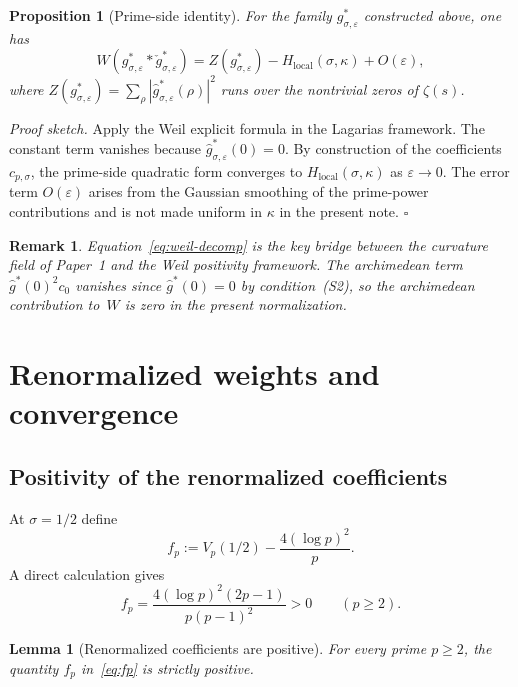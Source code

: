 \documentclass[11pt]{article}
\newtheorem*{lemma*}{Lemma}
\newtheorem*{proposition*}{Proposition}
\newtheorem*{remark*}{Remark}
\begin{document}
\begin{proposition*}[Prime-side identity]
For the family $g^*_{\sigma,\varepsilon}$ constructed above, one has
\begin{equation}\label{eq:weil-decomp}
W(g^*_{\sigma,\varepsilon} * \check g^*_{\sigma,\varepsilon})
=
Z(g^*_{\sigma,\varepsilon}) - H_{\mathrm{local}}(\sigma,\kappa) + O(\varepsilon),
\end{equation}
where
$Z(g^*_{\sigma,\varepsilon}) = \sum_{\rho}
|\widehat g^*_{\sigma,\varepsilon}(\rho)|^2$
runs over the nontrivial zeros of $\zeta(s)$.
\end{proposition*}

\textit{Proof sketch.}
Apply the Weil explicit formula in the Lagarias framework. The constant
term vanishes because $\widehat g^*_{\sigma,\varepsilon}(0)=0$.
By construction of the coefficients $c_{p,\sigma}$, the prime-side quadratic
form converges to $H_{\mathrm{local}}(\sigma,\kappa)$ as $\varepsilon\to 0$.
The error term $O(\varepsilon)$ arises from the Gaussian smoothing of the
prime-power contributions and is not made uniform in $\kappa$ in the present
note. \hfill$\square$

\begin{remark*}
Equation~\eqref{eq:weil-decomp} is the key bridge between the curvature field
of Paper~1 and the Weil positivity framework. The archimedean
term $\hat{g}^*(0)^2 c_0$ vanishes since $\hat{g}^*(0)=0$
by condition~(S2), so the archimedean contribution to~$W$
is zero in the present normalization.
\end{remark*}

\section{Renormalized weights and convergence}

\subsection{Positivity of the renormalized coefficients}

At $\sigma=1/2$ define
\[
f_p := V_p(1/2) - \frac{4(\log p)^2}{p}.
\]
A direct calculation gives
\begin{equation}\label{eq:fp}
f_p
= \frac{4(\log p)^2(2p-1)}{p(p-1)^2} > 0
\qquad (p\ge 2).
\end{equation}

\begin{lemma*}[Renormalized coefficients are positive]
For every prime $p\ge 2$, the quantity $f_p$ in~\eqref{eq:fp}
is strictly positive.
\end{lemma*}
\end{document}
